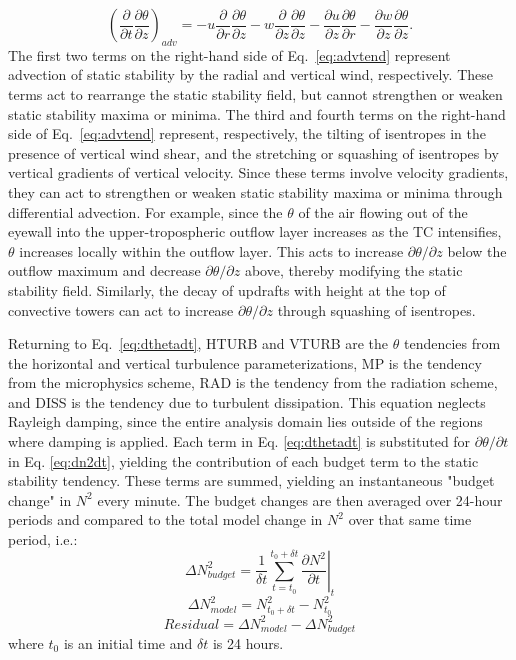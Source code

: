 \documentclass{ametsoc}
\begin{document}
   \begin{equation} \label{eq:advtend}
   \left(\frac{\partial}{\partial t}\frac{\partial \theta}{\partial z}\right)_{adv} = -u\frac{\partial}{\partial r}\frac{\partial \theta}{\partial z}-w\frac{\partial}{\partial z}\frac{\partial \theta}{\partial z}-\frac{\partial u}{\partial z}\frac{\partial \theta}{\partial r}-\frac{\partial w}{\partial z}\frac{\partial \theta}{\partial z}.
   \end{equation}
The first two terms on the right-hand side of Eq.~\ref{eq:advtend} represent advection of static stability by the radial and vertical wind, respectively.
These terms act to rearrange the static stability field, but cannot strengthen or weaken static stability maxima or minima.
The third and fourth terms on the right-hand side of Eq.~\ref{eq:advtend} represent, respectively, the tilting of isentropes in the presence of vertical wind shear, and the stretching or squashing of isentropes by vertical gradients of vertical velocity.
Since these terms involve velocity gradients, they can act to strengthen or weaken static stability maxima or minima through differential advection.
For example, since the $\theta$ of the air flowing out of the eyewall into the upper-tropospheric outflow layer increases as the TC intensifies, $\theta$ increases locally within the outflow layer.
This acts to increase $\partial \theta/\partial z$ below the outflow maximum and decrease $\partial \theta/\partial z$ above, thereby modifying the static stability field.
Similarly, the decay of updrafts with height at the top of convective towers can act to increase $\partial \theta/\partial z$ through squashing of isentropes.

Returning to Eq.~\ref{eq:dthetadt}, HTURB and VTURB are the $\theta$ tendencies from the horizontal and vertical turbulence parameterizations, MP is the tendency from the microphysics scheme, RAD is the tendency from the radiation scheme, and DISS is the tendency due to turbulent dissipation.
This equation neglects Rayleigh damping, since the entire analysis domain lies outside of the regions where damping is applied.
Each term in Eq. \ref{eq:dthetadt} is substituted for ${\partial \theta}/{\partial t}$ in Eq. \ref{eq:dn2dt}, yielding the contribution of each budget term to the static stability tendency.
These terms are summed, yielding an instantaneous "budget change" in $N^2$ every minute.
The budget changes are then averaged over 24-hour periods and compared to the total model change in $N^2$ over that same time period, i.e.:
   \begin{equation} \label{eq:budgetchange}
   \Delta N^2_{budget} = \frac{1}{\delta t}\sum_{t=t_0}^{t_0+\delta t} \left.\frac{\partial N^2}{\partial t}\right\vert_t
   \end{equation}
   \begin{equation} \label{eq:modelchange}
   \Delta N^2_{model} = N^2_{t_0+\delta t}-N^2_{t_0}
   \end{equation}
   \begin{equation} \label{eq:residual}
   Residual = \Delta N^2_{model}-\Delta N^2_{budget}
   \end{equation}
where $t_0$ is an initial time and $\delta t$ is 24 hours.
\end{document}
